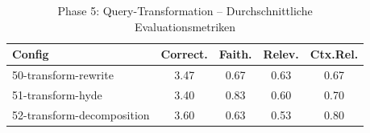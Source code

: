\begin{table}[H]
\centering
\small
\begin{tabular}{lcccc}
\toprule
Config & Correct. & Faith. & Relev. & Ctx.Rel. \\
\midrule
50-transform-rewrite & 3.47 & 0.67 & 0.63 & 0.67 \\
51-transform-hyde & 3.40 & 0.83 & 0.60 & 0.70 \\
52-transform-decomposition & 3.60 & 0.63 & 0.53 & 0.80 \\
\bottomrule
\end{tabular}
\caption{Phase 5: Query-Transformation -- Durchschnittliche Evaluationsmetriken}
\label{tab:phase5_eval}
\end{table}